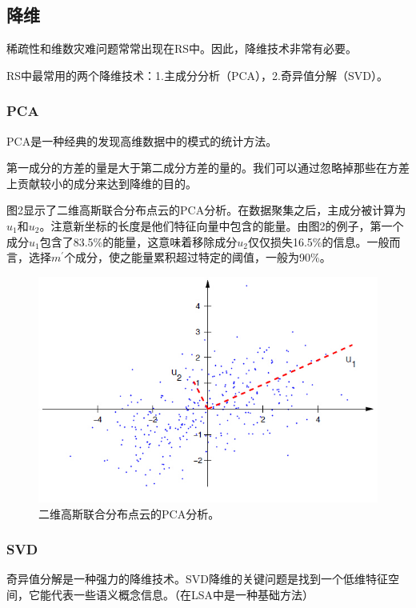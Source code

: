 \documentclass{article}
\begin{document}
 \subsection{降维}
 稀疏性和维数灾难问题常常出现在RS中。因此，降维技术非常有必要。

 RS中最常用的两个降维技术：1.主成分分析（PCA），2.奇异值分解（SVD）。

 \subsubsection{PCA}
 PCA是一种经典的发现高维数据中的模式的统计方法。

 第一成分的方差的量是大于第二成分方差的量的。我们可以通过忽略掉那些在方差上贡献较小的成分来达到降维的目的。

 图2显示了二维高斯联合分布点云的PCA分析。在数据聚集之后，主成分被计算为$u_1$和$u_2$。注意新坐标的长度是他们特征向量中包含的能量。由图2的例子，第一个成分$u_1$包含了83.5\%的能量，这意味着移除成分$u_2$仅仅损失16.5\%的信息。一般而言，选择$m^{'}$个成分，使之能量累积超过特定的阈值，一般为90\%。
 \begin{figure}[!htb]
	  \begin{center}
	  	\includegraphics[scale=0.6]{f2.2.jpg}
	  	\caption{二维高斯联合分布点云的PCA分析。}
	  \end{center}
 \end{figure}


 \subsubsection{SVD}
 奇异值分解是一种强力的降维技术。SVD降维的关键问题是找到一个低维特征空间，它能代表一些语义概念信息。（在LSA中是一种基础方法）
\end{document}
